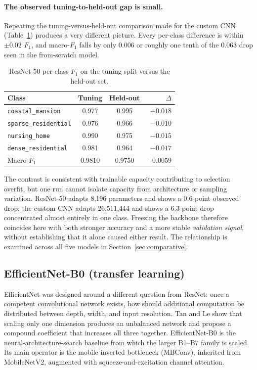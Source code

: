 \documentclass[11pt,twoside,a4paper]{article}
\begin{document}
\paragraph{The observed tuning-to-held-out gap is small.}
Repeating the tuning-versus-held-out comparison made for the custom CNN
(Table~\ref{tab:resnet50-bias}) produces a very different picture. Every
per-class difference is within $\pm 0.02$ $F_1$, and macro-$F_1$ falls by only
0.006 or roughly one tenth of the 0.063 drop seen in the from-scratch model.

\begin{table}[H]
\centering
\caption{ResNet-50 per-class $F_1$ on the tuning split versus the held-out set.}
\label{tab:resnet50-bias}
\small
\begin{tabular}{lccr}
\toprule
Class & Tuning & Held-out & $\Delta$ \\
\midrule
\texttt{coastal\_mansion}    & 0.977 & 0.995 & $+0.018$ \\
\texttt{sparse\_residential} & 0.976 & 0.966 & $-0.010$ \\
\texttt{nursing\_home}       & 0.990 & 0.975 & $-0.015$ \\
\texttt{dense\_residential}  & 0.981 & 0.964 & $-0.017$ \\
\midrule
Macro-$F_1$ & 0.9810 & 0.9750 & $-0.0059$ \\
\bottomrule
\end{tabular}
\end{table}

The contrast is consistent with trainable capacity contributing to selection
overfit, but one run cannot isolate capacity from architecture or sampling
variation. ResNet-50 adapts 8,196 parameters and shows a 0.6-point observed
drop; the custom CNN adapts 26,511,444 and shows a 6.3-point drop concentrated
almost entirely in one class. Freezing the backbone therefore coincides here
with both stronger accuracy and a more stable \emph{validation signal}, without
establishing that it alone caused either result. The relationship is examined
across all five models in
Section~\ref{sec:comparative}.

\subsection{EfficientNet-B0 (transfer learning)}
\label{sec:efficientnet}

EfficientNet was designed around a different question from ResNet: once a
competent convolutional network exists, how should additional computation be
distributed between depth, width, and input resolution. Tan and Le
\cite{Tan2019} show that scaling only one dimension produces an unbalanced
network and propose a compound coefficient that increases all three together.
EfficientNet-B0 is the neural-architecture-search baseline from which the larger
B1--B7 family is scaled. Its main operator is the mobile inverted bottleneck
(MBConv), inherited from MobileNetV2, augmented with squeeze-and-excitation
channel attention.
\end{document}
